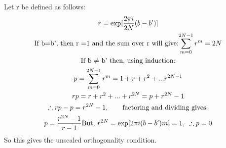 \documentclass[12pt]{article}
\begin{document}
Let r be defined as follows:
\begin{gather*}
r = \exp[ \frac{2 \pi i}{2N}(b-b')] \\ 
\text{If b=b', then r =1 and the sum over r will give:$ \sum_{m=0}^{2N-1} r^m =2N$} \\ 
\text{If b $\neq$ b' then, using induction:}\\
p = \sum_{m=0}^{2N-1} r^m = 1+r+r^2+...r^{2N-1}\\
rp = r+r^2+...+r^{2N} = p+r^{2N} -1\\
\therefore rp -p = r^{2N} -1, \qquad \text{factoring and dividing gives:}\\
p  = \frac{r^{2N} -1}{r-1}
\text{But, $r^{2N} = \exp[2 \pi i(b-b')m] =1, \; \; \therefore p =0$}
\end{gather*}
So this gives the 
unscaled orthogonality condition.
\end{document}
